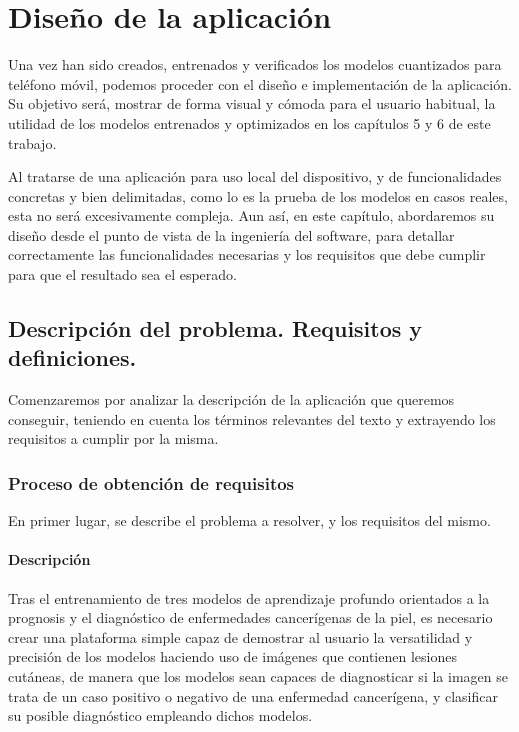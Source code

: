 \chapter{Diseño de la aplicación}

Una vez han sido creados, entrenados y verificados los modelos cuantizados para teléfono móvil, podemos proceder con el diseño e implementación de la aplicación. Su objetivo será, mostrar de forma visual y cómoda para el usuario habitual, la utilidad de los modelos entrenados y optimizados en los capítulos 5 y 6 de este trabajo.

Al tratarse de una aplicación para uso local del dispositivo, y de funcionalidades concretas y bien delimitadas, como lo es la prueba de los modelos en casos reales, esta no será excesivamente compleja. Aun así, en este capítulo, abordaremos su diseño desde el punto de vista de la ingeniería del software, para detallar correctamente las funcionalidades necesarias y los requisitos que debe cumplir para que el resultado sea el esperado.

\section{Descripción del problema. Requisitos y definiciones.}
\label{sec:descripcion}

Comenzaremos por analizar la descripción de la aplicación que queremos conseguir, teniendo en cuenta los términos relevantes del texto y extrayendo los requisitos a cumplir por la misma.

\subsection{Proceso de obtención de requisitos}

En  primer lugar, se describe el problema a resolver, y los requisitos del mismo.

\subsubsection{Descripción}
Tras el entrenamiento de tres modelos de aprendizaje profundo orientados a la prognosis y el diagnóstico de enfermedades cancerígenas de la piel, es necesario crear una plataforma simple capaz de demostrar al usuario la versatilidad y precisión de los modelos haciendo uso de imágenes que contienen lesiones cutáneas, de manera que los modelos sean capaces de diagnosticar si la imagen se trata de un caso positivo o negativo de una enfermedad cancerígena, y clasificar su posible diagnóstico empleando dichos modelos.

